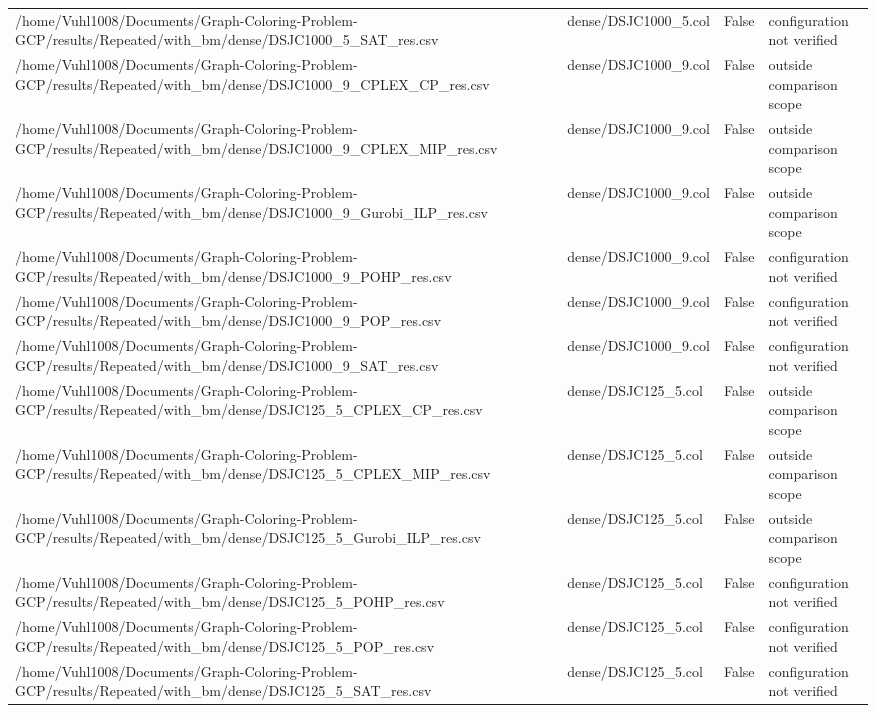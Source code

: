\begin{table}[htbp]
\begin{tabular}{llll}
/home/Vuhl1008/Documents/Graph-Coloring-Problem-GCP/results/Repeated/with\_bm/dense/DSJC1000\_5\_SAT\_res.csv & dense/DSJC1000\_5.col & False & configuration not verified \\
/home/Vuhl1008/Documents/Graph-Coloring-Problem-GCP/results/Repeated/with\_bm/dense/DSJC1000\_9\_CPLEX\_CP\_res.csv & dense/DSJC1000\_9.col & False & outside comparison scope \\
/home/Vuhl1008/Documents/Graph-Coloring-Problem-GCP/results/Repeated/with\_bm/dense/DSJC1000\_9\_CPLEX\_MIP\_res.csv & dense/DSJC1000\_9.col & False & outside comparison scope \\
/home/Vuhl1008/Documents/Graph-Coloring-Problem-GCP/results/Repeated/with\_bm/dense/DSJC1000\_9\_Gurobi\_ILP\_res.csv & dense/DSJC1000\_9.col & False & outside comparison scope \\
/home/Vuhl1008/Documents/Graph-Coloring-Problem-GCP/results/Repeated/with\_bm/dense/DSJC1000\_9\_POHP\_res.csv & dense/DSJC1000\_9.col & False & configuration not verified \\
/home/Vuhl1008/Documents/Graph-Coloring-Problem-GCP/results/Repeated/with\_bm/dense/DSJC1000\_9\_POP\_res.csv & dense/DSJC1000\_9.col & False & configuration not verified \\
/home/Vuhl1008/Documents/Graph-Coloring-Problem-GCP/results/Repeated/with\_bm/dense/DSJC1000\_9\_SAT\_res.csv & dense/DSJC1000\_9.col & False & configuration not verified \\
/home/Vuhl1008/Documents/Graph-Coloring-Problem-GCP/results/Repeated/with\_bm/dense/DSJC125\_5\_CPLEX\_CP\_res.csv & dense/DSJC125\_5.col & False & outside comparison scope \\
/home/Vuhl1008/Documents/Graph-Coloring-Problem-GCP/results/Repeated/with\_bm/dense/DSJC125\_5\_CPLEX\_MIP\_res.csv & dense/DSJC125\_5.col & False & outside comparison scope \\
/home/Vuhl1008/Documents/Graph-Coloring-Problem-GCP/results/Repeated/with\_bm/dense/DSJC125\_5\_Gurobi\_ILP\_res.csv & dense/DSJC125\_5.col & False & outside comparison scope \\
/home/Vuhl1008/Documents/Graph-Coloring-Problem-GCP/results/Repeated/with\_bm/dense/DSJC125\_5\_POHP\_res.csv & dense/DSJC125\_5.col & False & configuration not verified \\
/home/Vuhl1008/Documents/Graph-Coloring-Problem-GCP/results/Repeated/with\_bm/dense/DSJC125\_5\_POP\_res.csv & dense/DSJC125\_5.col & False & configuration not verified \\
/home/Vuhl1008/Documents/Graph-Coloring-Problem-GCP/results/Repeated/with\_bm/dense/DSJC125\_5\_SAT\_res.csv & dense/DSJC125\_5.col & False & configuration not verified \\

\end{tabular}
\end{table}
